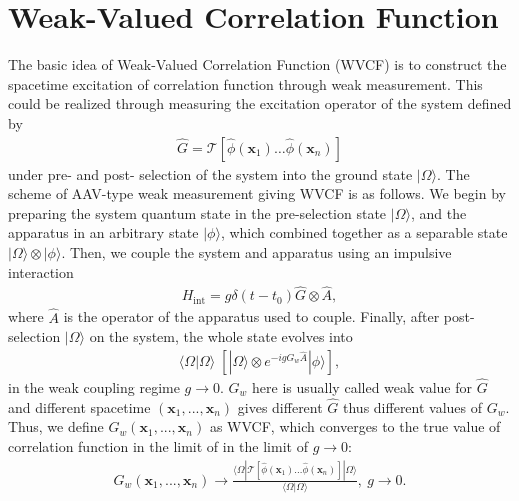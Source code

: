 \documentclass[twocolumn,pra,aps,superscriptaddress]{revtex4-2}
\begin{document}
\section{Weak-Valued Correlation Function}
\label{Weak Measurement as Excitations}

The basic idea of Weak-Valued Correlation Function (WVCF) is to construct the spacetime excitation of correlation function through weak measurement. This could be realized through measuring the excitation operator of the system defined by
\begin{align}\label{excitation operator}
\hat{G} = \mathcal{T}[\hat{\phi}(\textbf{x}_1)\ldots\hat{\phi}(\textbf{x}_n)]
\end{align}
under pre- and post- selection of the system into the ground state $|\Omega\rangle$.
The scheme of AAV-type weak measurement giving WVCF is as follows. We begin by preparing the system quantum state in the pre-selection state $|\Omega\rangle$, and the apparatus in an arbitrary state $|\phi\rangle$, which combined together as a separable state $|\Omega\rangle\otimes|\phi\rangle$.
Then, we couple the system and apparatus using an impulsive interaction
\begin{align}
\label{eq:Int}
H_{\text{int}}=g\delta(t-t_0)\hat{G}\otimes\hat{A},
\end{align}
where $\hat{A}$ is the operator of the apparatus used to couple. Finally, after post-selection $|\Omega\rangle$ on the system, the whole state evolves into 
\begin{align}
\langle\Omega|\Omega\rangle \; \left[  | \Omega\rangle\otimes  e^{-igG_w\hat{A}} |\phi\rangle\right],
\end{align} 
in the weak coupling regime $g\rightarrow0$. $G_w$ here is usually called weak value for $\hat{G}$ and different spacetime $(\textbf{x}_1,...,\textbf{x}_n)$ gives different $\hat{G}$ thus different values of $G_w$. Thus, we define $G_w(\textbf{x}_1,...,\textbf{x}_n)$ as WVCF, which converges to the true value of correlation function in the limit of in the limit of $g\rightarrow0$:
\begin{align}
G_w(\textbf{x}_1,...,\textbf{x}_n) \rightarrow \frac{\langle\Omega| \mathcal{T}[\hat{\phi}(\textbf{x}_1)\ldots\hat{\phi}(\textbf{x}_n)]|\Omega\rangle}{\langle\Omega|\Omega\rangle},~g\rightarrow0.
\end{align}
\end{document}
